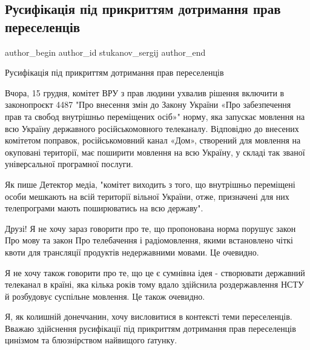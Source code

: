  
 
 
 
 
 
\subsection{Русифікація під прикриттям дотримання прав переселенців}
\label{sec:16_12_2021.fb.stukanov_sergij.1.russifikacia_pereselency}
 
\ifcmt
 author_begin
   author_id stukanov_sergij
 author_end
\fi

Русифікація під прикриттям дотримання прав переселенців 

Вчора, 15 грудня, комітет ВРУ з прав людини ухвалив рішення включити в
законопроєкт 4487 "Про внесення змін до Закону України «Про забезпечення прав
та свобод внутрішньо переміщених осіб»" норму, яка запускає мовлення на всю
Україну державного російськомовного телеканалу. Відповідно до внесених
комітетом поправок, російськомовний канал «Дом», створений для мовлення на
окуповані території, має поширити мовлення на всю Україну, у складі так званої
універсальної програмної послуги.

Як пише Детектор медіа, "комітет виходить з того, що внутрішньо переміщені
особи мешкають на всій території вільної України, отже, призначені для них
телепрограми мають поширюватись на всю державу".

Друзі! Я не хочу зараз говорити про те, що пропонована норма порушує закон Про
мову та закон Про телебачення і радіомовлення, якими встановлено чіткі квоти
для трансляції продуктів недержавними мовами. Це очевидно. 

Я не хочу також говорити про те, що це є сумнівна ідея - створювати державний
телеканал в країні, яка кілька років тому вдало здійснила роздержавлення НСТУ й
розбудовує суспільне мовлення. Це також очевидно.

Я, як колишній донеччанин, хочу висловитися в контексті теми переселенців.
Вважаю здійснення русифікації під прикриттям дотримання прав переселенців
цинізмом та блюзнірством найвищого ґатунку. 


